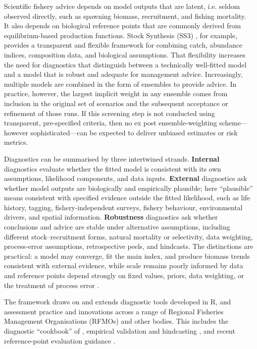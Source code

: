 \documentclass[11pt,a4paper]{article}
\begin{document}
Scientific fishery advice depends on model outputs that are latent, i.e. seldom observed directly, such as spawning biomass, recruitment, and fishing mortality. It also depends on biological reference points that are commonly derived from equilibrium-based production functions. Stock Synthesis (SS3) \citep{MethotWetzel2013}, for example, provides a transparent and flexible framework for combining catch, abundance indices, composition data, and biological assumptions. That flexibility increases the need for diagnostics that distinguish between a technically well-fitted model and a model that is robust and adequate for management advice. Increasingly, multiple models are combined in the form of ensembles to provide advice. In practice, however, the largest implicit weight in any ensemble comes from inclusion in the original set of scenarios and the subsequent acceptance or refinement of those runs. If this screening step is not conducted using transparent, pre-specified criteria, then no ex post ensemble-weighting scheme—however sophisticated—can be expected to deliver unbiased estimates or risk metrics.

Diagnostics can be summarised by three intertwined strands. \textbf{Internal} diagnostics evaluate whether the fitted model is consistent with its own assumptions, likelihood components, and data inputs. \textbf{External} diagnostics ask whether model outputs are biologically and empirically plausible; here ``plausible'' means consistent with specified evidence outside the fitted likelihood, such as life history, tagging, fishery-independent surveys, fishery behaviour, environmental drivers, and spatial information. \textbf{Robustness} diagnostics ask whether conclusions and advice are stable under alternative assumptions, including different stock--recruitment forms, natural mortality or selectivity, data weighting, process-error assumptions, retrospective peels, and hindcasts. The distinctions are practical: a model may converge, fit the main index, and produce biomass trends consistent with external evidence, while scale remains poorly informed by data and reference points depend strongly on fixed values, priors, data weighting, or the treatment of process error \citep{ICES2026}.

The framework draws on and extends diagnostic tools developed in R, and assessment practice and innovations across a range of Regional Fisheries Management Organisations (RFMOs) and other bodies. This includes the diagnostic ``cookbook'' of \citet{carvalho2021cookbook}, empirical validation and hindcasting \citep{kell2016evaluation,kell2024empirical}, and recent reference-point evaluation guidance \citep{ICES2024}.
\end{document}

